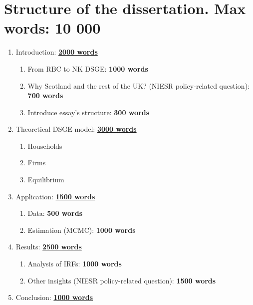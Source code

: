 \section*{Structure of the dissertation. Max words: 10 000}

\begin{enumerate}
    \item Introduction: \underline{\textbf{2000 words}}
    \begin{enumerate}
        \item From RBC to NK DSGE: \textbf{1000 words}
        \item Why Scotland and the rest of the UK? (NIESR policy-related question): \textbf{700 words}
        \item Introduce essay's structure: \textbf{300 words}
    \end{enumerate}
    \item Theoretical DSGE model: \underline{\textbf{3000 words}}
    \begin{enumerate}
        \item Households
        \item Firms
        \item Equilibrium
    \end{enumerate}
    \item Application: \underline{\textbf{1500 words}}
    \begin{enumerate}
        \item Data: \textbf{500 words}
        \item Estimation (MCMC): \textbf{1000 words}
    \end{enumerate}
    \item Results: \underline{\textbf{2500 words}}
    \begin{enumerate}
        \item Analysis of IRFs: \textbf{1000 words}
        \item Other insights (NIESR policy-related question): \textbf{1500 words}
    \end{enumerate}
    \item Conclusion: \underline{\textbf{1000 words}}
\end{enumerate}